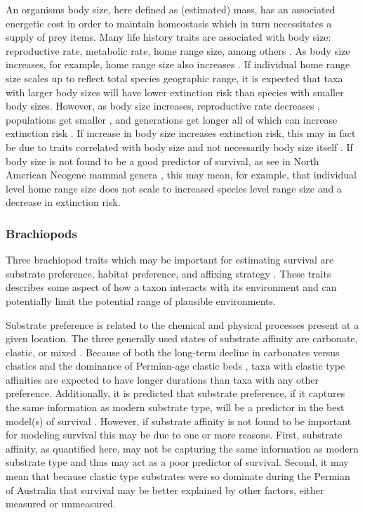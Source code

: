 \documentclass[12pt,letterpaper]{article}
\begin{document}
An organisms body size, here defined as (estimated) mass, has an associated energetic cost in order to maintain homeostasis which in turn necessitates a supply of prey items. Many life history traits are associated with body size: reproductive rate, metabolic rate, home range size, among others \cite{Peters1983a,Damuth1979,Brown1987,Smith2004}. As body size increases, for example, home range size also increases \citep{Damuth1979}. If individual home range size scales up to reflect total species geographic range, it is expected that taxa with larger body sizes will have lower extinction risk than species with smaller body sizes. However, as body size increases, reproductive rate decreases \citep{Johnson2002b}, populations get smaller \citep{White2007}, and generations get longer \citep{Martin1993a} all of which can increase extinction risk \citep{Liow2008,Davidson2012}. If increase in body size increases extinction risk, this may in fact be due to traits correlated with body size and not necessarily body size itself \citep{Johnson2002b}. If body size is not found to be a good predictor of survival, as see in North American Neogene mammal genera \citep{Tomiya2013}, this may mean, for example, that individual level home range size does not scale to increased species level range size and a decrease in extinction risk. 

\subsubsection{Brachiopods}
Three brachiopod traits which may be important for estimating survival are substrate preference, habitat preference, and affixing strategy \citep{Alexander1977,Richardson1997,Richardson1997a,Johansen1989}. These traits describes some aspect of how a taxon interacts with its environment and can potentially limit the potential range of plausible environments.

Substrate preference is related to the chemical and physical processes present at a given location. The three generally used states of substrate affinity are carbonate, clastic, or mixed \citep{Foote2006,Anderson2011a,Nurnberg2013a,Kiessling2007a,Miller2001}. Because of both the long-term decline in carbonates versus clastics \citep{Peters2008} and the dominance of Permian-age clastic beds \citep{Birgenheier2010,Percival2012,Thomas2007,Fielding2008a,Fielding2008}, taxa with clastic type affinities are expected to have longer durations than taxa with any other preference. Additionally, it is predicted that substrate preference, if it captures the same information as modern substrate type, will be a predictor in the best model(s) of survival \citep{Richardson1997,Richardson1997a}. However, if substrate affinity is not found to be important for modeling survival this may be due to one or more reasons. First, substrate affinity, as quantified here, may not be capturing the same information as modern substrate type and thus may act as a poor predictor of survival. Second, it may mean that because clastic type substrates were so dominate during the Permian of Australia that survival may be better explained by other factors, either measured or unmeasured. 
\end{document}
